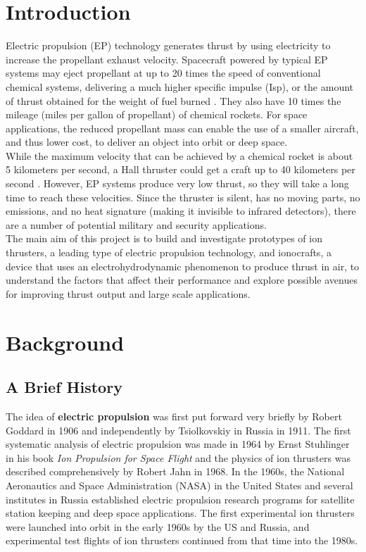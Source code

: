 \documentclass[11pt]{article}
\begin{document}
\pagebreak

\section{Introduction}

Electric propulsion (EP) technology generates thrust by using electricity to increase the propellant exhaust velocity. Spacecraft powered by typical EP systems may eject propellant at up to 20 times the speed of conventional chemical systems, delivering a much higher specific impulse (Isp), or the amount of thrust obtained for the weight of fuel burned \cite{nasa}. They also have 10 times the mileage (miles per gallon of propellant) of chemical rockets. For space applications, the reduced propellant mass can enable the use of a smaller aircraft, and thus lower cost, to deliver an object into orbit or deep space.\\

While the maximum velocity that can be achieved by a chemical rocket is about 5 kilometers per second, a Hall thruster could get a craft up to 40 kilometers per second \cite{space}. However, EP systems produce very low thrust, so they will take a long time to reach these velocities. Since the thruster is silent, has no moving parts, no emissions, and no heat signature (making it invisible to infrared detectors), there are a number of potential military and security applications.\\

The main aim of this project is to build and investigate prototypes of ion thrusters, a leading type of electric propulsion technology, and ionocrafts, a device that uses an electrohydrodynamic phenomenon to produce thrust in air, to understand the factors that affect their performance and explore possible avenues for improving thrust output and large scale applications.


\section{Background}

\subsection{A Brief History}

The idea of \textbf{electric propulsion} was first put forward very briefly by Robert Goddard in 1906 and independently by Tsiolkovskiy in Russia in 1911. The first systematic analysis of electric propulsion was made in 1964 by Ernst Stuhlinger in his book \textit{Ion Propulsion for Space Flight} and the physics of ion thrusters was described comprehensively by Robert Jahn in 1968. In the 1960s, the National Aeronautics and Space Administration (NASA) in the United States and several institutes in Russia established electric propulsion research programs for satellite station keeping and deep space applications. The first experimental ion thrusters were launched into orbit in the early 1960s by the US and Russia, and experimental test flights of ion thrusters continued from that time into the 1980s.\\
\end{document}
